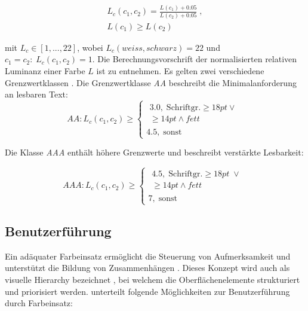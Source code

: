 \documentclass[11pt, bibliography=totoc]{scrartcl}
\begin{document}
\begin{equation}
	\begin{split}
		L_c(c_1, c_2) = \frac{L(c_1) + 0.05}{L(c_2) + 0.05} \;,\\ L(c_1) \geq L(c_2)
	\end{split}
\end{equation}

mit $L_c \in [1, ... , 22]$, wobei $L_c(weiss, schwarz) = 22$ und $c_1 = c_2: \;L_c(c_1, c_2) = 1$. Die Berechnungsvorschrift der normalisierten relativen Luminanz einer Farbe $L$ ist \citep{wcag-rel-luminance} zu entnehmen.
Es gelten zwei verschiedene Grenzwertklassen \citep{wcag}. Die Grenzwertklasse \emph{AA} beschreibt die Minimalanforderung an lesbaren Text:
\begin{equation}
  	AA: L_c(c_1, c_2) \geq
	\begin{cases}
		\begin{split}3.0, \; \text{Schriftgr.} \geq 18pt \lor \\ \geq 14pt \land fett\end{split} \\
		4.5,  \;  \text{sonst}
	\end{cases}
\end{equation}

Die Klasse \emph{AAA} enthält höhere Grenzwerte und beschreibt verstärkte Lesbarkeit:

\begin{equation}
  	AAA: L_c(c_1, c_2) \geq
	\begin{cases}
		\begin{split}4.5, \; \text{Schriftgr.} \geq 18pt \; \lor \\ \geq 14pt \land fett\end{split} \\
		7,  \;  \text{sonst}
	\end{cases}
\end{equation}

\subsection{Benutzerführung}
\label{sec:usability}
Ein adäquater Farbeinsatz ermöglicht die Steuerung von Aufmerksamkeit und unterstützt die Bildung von Zusammenhängen \citep{webdesign}.  Dieses Konzept wird auch als visuelle Hierarchy bezeichnet \citep{visual-hierarchy}, bei welchem die Oberflächenelemente strukturiert und priorisiert werden.
\citet{webdesign} unterteilt folgende Möglichkeiten zur Benutzerführung durch Farbeinsatz:
\end{document}
